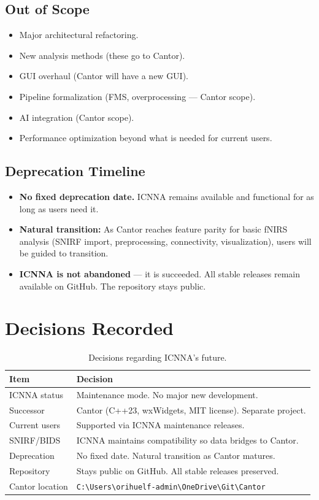 \documentclass[11pt,a4paper]{article}
\begin{document}
\subsection{Out of Scope}
\begin{itemize}
    \item Major architectural refactoring.
    \item New analysis methods (these go to Cantor).
    \item GUI overhaul (Cantor will have a new GUI).
    \item Pipeline formalization (FMS, overprocessing --- Cantor scope).
    \item AI integration (Cantor scope).
    \item Performance optimization beyond what is needed for current users.
\end{itemize}

\subsection{Deprecation Timeline}
\begin{itemize}
    \item \textbf{No fixed deprecation date.} ICNNA remains available and functional for as long as users need it.
    \item \textbf{Natural transition:} As Cantor reaches feature parity for basic fNIRS analysis (SNIRF import, preprocessing, connectivity, visualization), users will be guided to transition.
    \item \textbf{ICNNA is not abandoned} --- it is succeeded. All stable releases remain available on GitHub. The repository stays public.
\end{itemize}

\section{Decisions Recorded}

\begin{table}[h]
\centering
\begin{tabular}{lp{10cm}}
\toprule
\textbf{Item} & \textbf{Decision} \\
\midrule
ICNNA status & Maintenance mode. No major new development. \\
Successor & Cantor (C++23, wxWidgets, MIT license). Separate project. \\
Current users & Supported via ICNNA maintenance releases. \\
SNIRF/BIDS & ICNNA maintains compatibility so data bridges to Cantor. \\
Deprecation & No fixed date. Natural transition as Cantor matures. \\
Repository & Stays public on GitHub. All stable releases preserved. \\
Cantor location & \texttt{C:\textbackslash Users\textbackslash orihuelf-admin\textbackslash OneDrive\textbackslash Git\textbackslash Cantor} \\
\bottomrule
\end{tabular}
\caption{Decisions regarding ICNNA's future.}
\end{table}
\end{document}
